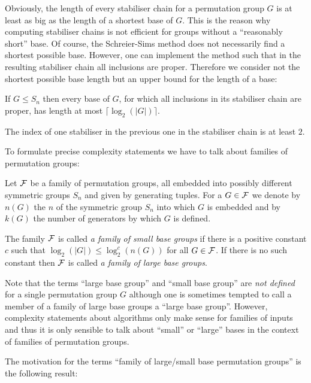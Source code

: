 Obviously, the length of every stabiliser chain for a permutation group 
$G$ is at least as big as the length of a shortest base of $G$.
This is the reason why computing stabiliser chains is not efficient
for groups without a ``reasonably short'' base. Of course, the
Schreier-Sims method does not necessarily find a shortest possible base.
However, one can implement the method such that in the resulting
stabiliser chain all inclusions are proper.
Therefore we consider not the shortest possible base length but
an upper bound for the length of a base:

\begin{Prop}
If $G \le S_n$ then every base of $G$, for which all inclusions in its
stabiliser chain are proper, has length at most $\lceil \log_2(|G|) \rceil$.
\end{Prop}
\proofbeg
The index of one stabiliser in the previous one in the stabiliser chain is
at least $2$.
\proofend

To formulate precise complexity statements we have to talk about families
of permutation groups:

\begin{Def}
    \label{SmallLargeBase}
Let $\mathcal{F}$ be a family of permutation groups, all embedded into
possibly different symmetric groups $S_n$ and given by generating tuples. 
For a $G \in \mathcal{F}$ we denote 
by $n(G)$ the $n$ of the symmetric group $S_n$ into which $G$ is embedded
and by $k(G)$ the number of generators by which $G$ is defined.

The family $\mathcal{F}$ is called \emph{a family of small base groups} if there
is a positive constant $c$ such that $\log_2(|G|) \le \log^c_2(n(G))$ for all
$G \in \mathcal{F}$. If there is no such constant then $\mathcal{F}$ is called
\emph{a family of large base groups}.
\end{Def}

\begin{Rem}
Note that the terms ``large base group'' and ``small base group'' are
\emph{not defined} for a single permutation group $G$ although one is
sometimes tempted to call a member of a family of large base groups
a ``large base group''. However, complexity statements about algorithms
only make sense for families of inputs and thus it is only sensible to
talk about ``small'' or ``large'' bases in the context of families of
permutation groups.
\end{Rem}

The motivation for the terms ``family of large/small base permutation
groups'' is the following result:

